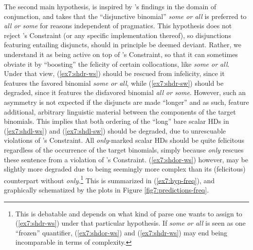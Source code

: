 The second main hypothesis, is inspired by \textcite{Benor2006}'s findings in the domain of conjunction, and takes that the ``disjunctive binomial'' \textit{some or all} is preferred to \textit{all or some} for reasons independent of pragmatics. This hypothesis does not reject \citeauthor{Hurford1974}'s Constraint (or any specific implementation thereof), so disjunctions featuring entailing disjuncts, should in principle be deemed deviant. Rather, we understand it as being active on top of \citeauthor{Hurford1974}'s Constraint, so that it can sometimes obviate it by ``boosting'' the felicity of certain collocations, like \textit{some or all}. Under that view, (\ref{ex7:shdr-ws}) should be rescued from infelicity, since it features the favored binomial \textit{some or all}, while (\ref{ex7:shdr-sw}) should be degraded, since it features the disfavored binomial \textit{all or some}. However, such an asymmetry is not expected if the disjuncts are made ``longer'' and as such, feature additional, arbitrary linguistic material between the components of the target binomials. This implies that both ordering of the ``long'' bare scalar HDs in (\ref{ex7:shdl-ws}) and (\ref{ex7:shdl-sw}) should be degraded, due to unrescuable violations of \citeauthor{Hurford1974}'s Constraint. All \textit{only}-marked scalar HDs should be quite felicitous regardless of the occurrence of the target binomials, simply because \textit{only} rescues these sentence from a violation of \citeauthor{Hurford1974}'s Constraint. (\ref{ex7:shdor-ws}) however, may be slightly more degraded due to being seemingly more complex than its (felicitous) counterpart without \textit{only}.\footnote{This is debatable and depends on what kind of parse one wants to assign to (\ref{ex7:shdr-ws}) under that particular hypothesis. If \textit{some or all} is seen as one ``frozen'' quantifier, (\ref{ex7:shdor-ws}) and (\ref{ex7:shdr-ws}) may end being incomparable in terms of complexity.} This is summarized in (\ref{ex7:hyp-freq}), and graphically schematized by the plots in Figure \ref{fig7:predictions-freq}.
\begin{exe}
	\label{ex7:hyp-freq}
\end{exe}
